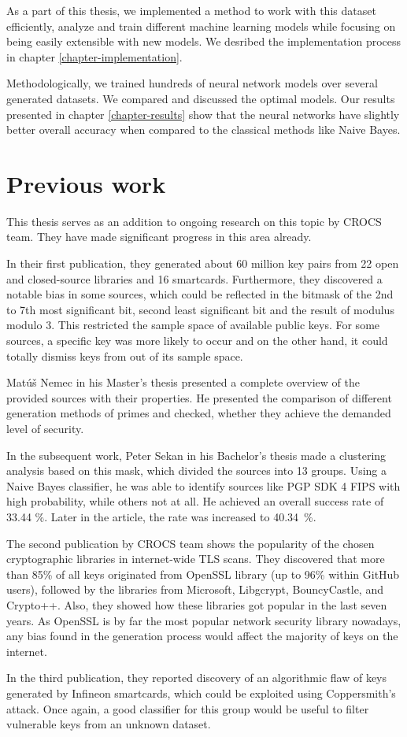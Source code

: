 As a part of this thesis, we implemented a method to work with this dataset efficiently, analyze and train different machine learning models while focusing on being easily extensible with new models. We desribed the implementation process in chapter \ref{chapter-implementation}.

Methodologically, we trained hundreds of neural network models over several generated datasets. We compared and discussed the optimal models. Our results presented in chapter \ref{chapter-results} show that the neural networks have slightly better overall accuracy when compared to the classical methods like Naive Bayes.

\section{Previous work}
\label{chapter-prev-work}

This thesis serves as an addition to ongoing research on this topic by CROCS team. They have made significant progress in this area already. 

In their first publication\cite{svenda_1}, they generated about 60 million key pairs from 22 open and closed-source libraries and 16 smartcards. Furthermore, they discovered a notable bias in some sources, which could be reflected in the bitmask of the 2nd to 7th most significant bit, second least significant bit and the result of modulus modulo 3. This restricted the sample space of available public keys. For some sources, a specific key was more likely to occur and on the other hand, it could totally dismiss keys from out of its sample space.

Mat\'{u}š Nemec in his Master's thesis\cite{thesis_matus_nemec} presented a complete overview of the provided sources with their properties. He presented the comparison of different generation methods of primes and checked, whether they achieve the demanded level of security.

In the subsequent work, Peter Sekan in his Bachelor's thesis\cite{thesis_sekan} made a clustering analysis based on this mask, which divided the sources into 13 groups. Using a Naive Bayes classifier, he was able to identify sources like PGP SDK 4 FIPS with high probability, while others not at all. He achieved an overall success rate of 33.44 \%. Later in the article\cite{svenda_1}, the rate was increased to 40.34~\%.

The second publication by CROCS team\cite{svenda_3} shows the popularity of the chosen cryptographic libraries in internet-wide TLS scans. They discovered that more than 85\% of all keys originated from OpenSSL library (up to 96\% within GitHub users), followed by the libraries from Microsoft, Libgcrypt, BouncyCastle, and Crypto++. Also, they showed how these libraries got popular in the last seven years. As OpenSSL is by far the most popular network security library nowadays, any bias found in the generation process would affect the majority of keys on the internet.

In the third publication\cite{svenda_2}, they reported discovery of an algorithmic flaw of keys generated by Infineon smartcards, which could be exploited using Coppersmith's attack. Once again, a good classifier for this group would be useful to filter vulnerable keys from an unknown dataset.

